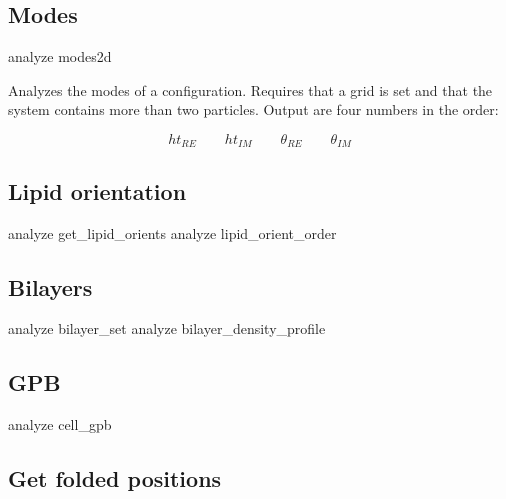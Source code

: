 \subsection{Modes}
\label{analyze:modes2d}

\begin{essyntax}
  analyze modes2d
\end{essyntax}

Analyzes the modes of a configuration. Requires that a grid is set and
that the system contains more than two particles. Output are four
numbers in the order:

\begin{displaymath}
ht_{RE}\qquad ht_{IM}\qquad \theta_{RE}\qquad \theta_{IM}
\end{displaymath}

\subsection{Lipid orientation}
\label{analyze:lipids}

\begin{essyntax}
   analyze get_lipid_orients
   analyze lipid_orient_order
\end{essyntax}


\subsection{Bilayers}
\label{analyze:bilayers}

\begin{essyntax}
   analyze bilayer_set
   analyze bilayer_density_profile
\end{essyntax}


\subsection{GPB}
\label{analyze:cellgpb}

\begin{essyntax}
  analyze cell_gpb  
   
\end{essyntax}


\subsection{Get folded positions}
\label{analyze:folded}

